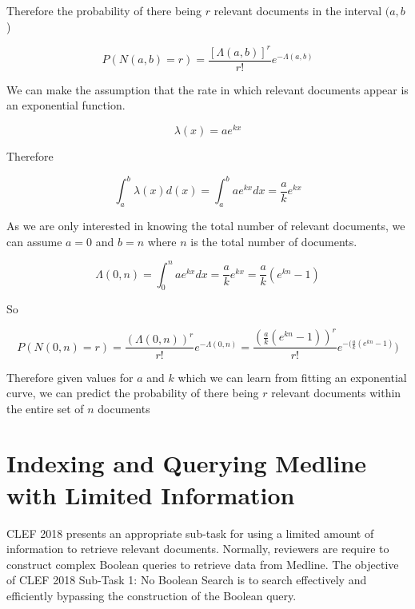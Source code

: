 Therefore the probability of there being $r$ relevant documents in the interval $(a, b$)

\begin{equation}
	   P(N(a, b) = r) = \frac{[\Lambda(a,b)]^r}{r!} e^{-\Lambda(a,b)}
\end{equation}

We can make the assumption that the rate in which relevant documents appear is an exponential function.

\begin{equation}
	   \lambda(x) = ae^{kx}
\end{equation}

Therefore

\begin{equation}
	   \int_a^b \lambda(x) d(x) = \int_a^b ae^{kx} dx = \frac{a}{k}e^{kx}
\end{equation}

As we are only interested in knowing the total number of relevant documents, we can assume $a=0$ and $b=n$ where $n$ is the total number of documents.

\begin{equation}
	   \Lambda(0, n) = \int_0^n ae^{kx}dx = \frac{a}{k}e^{kx} = \frac{a}{k}(e^{kn} - 1)
\end{equation}

So

\begin{equation}
	   P(N(0,n) = r) = \frac{(\Lambda(0,n))^r}{r!}e^{-\Lambda(0,n)} = \frac{\left(\frac{a}{k}(e^{kn} -1)\right)^r}{r!} e^{-(\frac{a}{k}(e^{kn} - 1)})
\end{equation}

Therefore given values for $a$ and $k$ which we can learn from fitting an exponential curve, we can predict the probability of there being $r$ relevant documents within the entire set of $n$ documents


\section{Indexing and Querying Medline with Limited Information}

CLEF 2018 \cite{CLEFLINK} presents an appropriate sub-task for using a limited amount of information to retrieve relevant documents. Normally, reviewers are require to construct complex Boolean queries to retrieve data from Medline. The objective of CLEF 2018 Sub-Task 1: No Boolean Search \cite{CLEFLINK} is to search effectively and efficiently bypassing the construction of the Boolean query.

